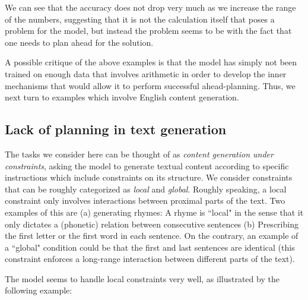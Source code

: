 We can see that the accuracy does not drop very much as we increase the range of the numbers, suggesting that it is not the calculation itself that poses a problem for the model, but instead the problem seems to be with the fact that one needs to plan ahead for the solution.

A possible critique of the above examples is that the model has simply not been trained on enough data that involves arithmetic in order to develop the inner mechanisms that would allow it to perform successful ahead-planning. Thus, we next turn to examples which involve English content generation.

\subsection{Lack of planning in text generation} The tasks we consider here can be thought of as \emph{content generation under constraints}, asking the model to generate textual content according to specific instructions which include constraints on its structure. We consider constraints that can be roughly categorized as \emph{local} and \emph{global}. Roughly speaking, a local constraint only involves interactions between proximal parts of the text. Two examples of this are (a) generating rhymes: A rhyme is ``local" in the sense that it only dictates a (phonetic) relation between consecutive sentences (b) Prescribing the first letter or the first word in each sentence. On the contrary, an example of a ``global" condition could be that the first and last sentences are identical (this constraint enforces a long-range interaction between different parts of the text).

The model seems to handle local constraints very well, as illustrated by the following example:

